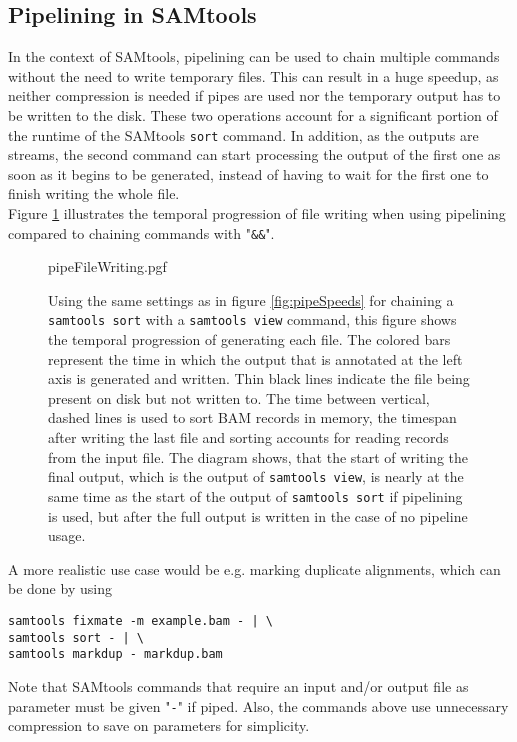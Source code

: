 \subsection{Pipelining in SAMtools}
In the context of SAMtools, pipelining can be used to chain multiple commands without the need to write temporary files. This can result in a huge speedup, as neither compression is needed if pipes are used nor the temporary output has to be written to the disk. These two operations account for a significant portion of the runtime of the SAMtools \texttt{sort} command. In addition, as the outputs are streams, the second command can start processing the output of the first one as soon as it begins to be generated, instead of having to wait for the first one to finish writing the whole file. \\
Figure \ref{fig:pipeWrite} illustrates the temporal progression of file writing when using pipelining compared to chaining commands with "\texttt{\&\&}".
\begin{figure}
        {pipeFileWriting.pgf}
    \caption{Using the same settings as in figure \ref{fig:pipeSpeeds} for chaining a \texttt{samtools sort} with a \texttt{samtools view} command, this figure shows the temporal progression of generating each file. The colored bars represent the time in which the output that is annotated at the left axis is generated and written. Thin black lines indicate the file being present on disk but not written to. The time between vertical, dashed lines is used to sort BAM records in memory, the timespan after writing the last file and sorting accounts for reading records from the input file. The diagram shows, that the start of writing the final output, which is the output of \texttt{samtools view}, is nearly at the same time as the start of the output of \texttt{samtools sort} if pipelining is used, but after the full output is written in the case of no pipeline usage.}
    \label{fig:pipeWrite}
\end{figure}
A more realistic use case would be e.g. marking duplicate alignments, which can be done by using 
\begin{verbatim} 
samtools fixmate -m example.bam - | \
samtools sort - | \ 
samtools markdup - markdup.bam
\end{verbatim}
Note that SAMtools commands that require an input and/or output file as parameter must be given "\texttt{-}" if piped. Also, the commands above use unnecessary compression to save on parameters for simplicity. \\

